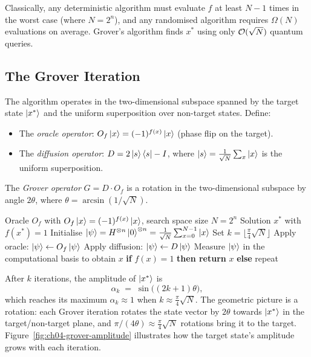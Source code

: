 Classically, any deterministic algorithm must evaluate $f$ at least $N - 1$ times in the worst case (where $N = 2^n$), and any randomised algorithm requires $\Omega(N)$ evaluations on average.  Grover's algorithm finds $x^*$ using only $\mathcal{O}(\sqrt{N})$ quantum queries.


\subsection{The Grover Iteration}
\label{subsec:grover-iteration}

The algorithm operates in the two-dimensional subspace spanned by the target state $\ket{x^*}$ and the uniform superposition over non-target states.  Define:
\begin{itemize}
\item The \emph{oracle operator}: $O_f\ket{x} = (-1)^{f(x)}\ket{x}$ (phase flip on the target).
\item The \emph{diffusion operator}: $D = 2\ket{s}\bra{s} - I$, where $\ket{s} = \frac{1}{\sqrt{N}}\sum_x \ket{x}$ is the uniform superposition.
\end{itemize}
The \emph{Grover operator} $G = D \cdot O_f$ is a rotation in the two-dimensional subspace by angle $2\theta$, where $\theta = \arcsin(1/\sqrt{N})$.

\begin{algorithm}[t]
\caption{Grover's Algorithm}
\label{alg:grover}
\begin{algorithmic}[1]
\Require Oracle $O_f$ with $O_f\ket{x} = (-1)^{f(x)}\ket{x}$, search space size $N = 2^n$
\Ensure Solution $x^*$ with $f(x^*) = 1$
\State Initialise $\ket{\psi} = H^{\otimes n}\ket{0}^{\otimes n} = \frac{1}{\sqrt{N}}\sum_{x=0}^{N-1}\ket{x}$
\State Set $k = \bigl\lfloor \frac{\pi}{4}\sqrt{N}\bigr\rfloor$
  \State Apply oracle: $\ket{\psi} \gets O_f\ket{\psi}$
  \State Apply diffusion: $\ket{\psi} \gets D\ket{\psi}$
\EndFor
\State Measure $\ket{\psi}$ in the computational basis to obtain $x$
\State \textbf{if} $f(x) = 1$ \textbf{then return} $x$ \textbf{else} repeat
\end{algorithmic}
\end{algorithm}

After $k$ iterations, the amplitude of $\ket{x^*}$ is
\begin{equation}
\label{eq:grover-amplitude}
\alpha_k \;=\; \sin\bigl((2k+1)\theta\bigr),
\end{equation}
which reaches its maximum $\alpha_k \approx 1$ when $k \approx \frac{\pi}{4}\sqrt{N}$.  The geometric picture is a rotation: each Grover iteration rotates the state vector by $2\theta$ towards $\ket{x^*}$ in the target/non-target plane, and $\pi/(4\theta) \approx \frac{\pi}{4}\sqrt{N}$ rotations bring it to the target.  Figure~\ref{fig:ch04-grover-amplitude} illustrates how the target state's amplitude grows with each iteration.

